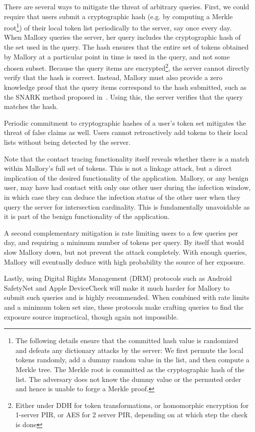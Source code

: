 {	There are several ways to mitigate the threat of arbitrary queries. First, 
	we could require that users submit a cryptographic hash (e.g. by computing a Merkle root\footnote{The following details ensure that the committed hash value is randomized and defeats any dictionary attacks by the server: We first permute the local tokens randomly, add a dummy random value in the list, and then compute a Merkle tree. The Merkle root is committed as the cryptographic hash of the list. The adversary does not know the dummy value or the permuted order and hence is unable to forge a Merkle proof.}) of their local token
	list periodically to the \dect server, say once every day.
	When Mallory queries the server, her query includes the cryptographic hash of the set used in the query. The hash ensures that the entire set of tokens obtained by Mallory at a particular point in time is used in the query, and not some chosen subset. Because the query items are encrypted\footnote{Either under DDH for token transformations, or homomorphic encryption for 1-server PIR, or AES for 2 server PIR, depending on at which step the check is done}, the \dect server cannot directly verify that the hash is correct. Instead, Mallory must also provide a zero knowledge proof that the query items correspond to the hash submitted, such as the SNARK method proposed in~\cite{USENIX:BCTV14}. Using this, the \dect server verifies that the query matches the hash.
	
	Periodic commitment to cryptographic hashes of a user's token set mitigates the threat of false claims as well. Users cannot retroactively add tokens to their local lists without being detected by the \dect server.
	
	Note that the contact tracing functionality itself reveals whether there is a match within Mallory's full set of tokens. This is not a linkage attack, but a direct implication of the desired functionality of the application. Mallory, or any benign user, may have had contact with only one other user during the infection window, in which case they can deduce the infection status of the other user when they query the \dect server for intersection cardinality. This is fundamentally unavoidable as it is part of the benign functionality of the application.
	
	A second complementary mitigation is rate limiting users to a few queries per day, and requiring a minimum number of tokens per query. By itself that would slow Mallory down, but not prevent the attack completely. With enough queries, Mallory will eventually deduce with high probability the source of her exposure.
	
	Lastly, using Digital Rights Management (DRM) protocols such as Android SafetyNet and Apple DeviceCheck will make it much harder for Mallory to submit such queries and is highly recommended. When combined with rate limits and a minimum token set size, these protocols make crafting queries to find the exposure source impractical, though again not impossible. 
}

